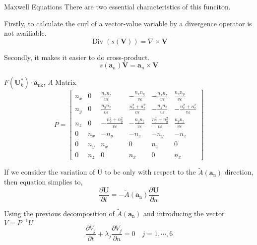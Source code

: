 \begin{frame}{Maxwell Equations}
There are two essential characteristics of this funciton.

Firstly, to calculate the curl of a vector-value variable by a divergence operator is not availiable. 
\begin{equation}
\operatorname{Div}(s(\boldsymbol{V}))=\nabla \times \boldsymbol{V}
\end{equation}


Secondly, it makes it easier to do cross-product.
\begin{equation}
s(\boldsymbol{a}_n)\boldsymbol{V}= \boldsymbol{a}_n \times \boldsymbol{V}
\end{equation}


\end{frame}
\begin{frame}{$F\left(\boldsymbol{U}_{k}^{*}\right) \cdot \boldsymbol{a}_{\mathrm{nk}}$, $A$ Matrix}
\begin{equation}
P=\left[\begin{array}{cccccc}{n_{x}} & {0} & {\frac{n_{x} n_{z}}{v \varepsilon}} & {-\frac{n_{x} n_{y}}{v \varepsilon}} & {-\frac{n_{x} n_{z}}{v \varepsilon}} & {\frac{n_{x} n_{y}}{v \varepsilon}} \\ {n_{y}} & {0} & {\frac{n_{y} n_{z}}{v \varepsilon}} & {\frac{n_{x}^{2}+n_{z}^{2}}{v \varepsilon}} & {-\frac{n_{y} n_{z}}{v \varepsilon}} & {-\frac{n_{x}^{2}+n_{z}^{2}}{v \varepsilon}} \\ {n_{z}} & {0} & {-\frac{n_{x}^{2}+n_{y}^{2}}{v \varepsilon}} & {-\frac{n_{y} n_{z}}{v \varepsilon}} & {\frac{n_{x}^{2}+n_{y}^{2}}{v \varepsilon}} & {\frac{n_{y} n_{z}}{v \varepsilon}} \\ {0} & {n_{x}} & {-n_{y}} & {-n_{z}} & {-n_{y}} & {-n_{z}} \\ {0} & {n_{y}} & {n_{x}} & {0} & {n_{x}} & {0} \\ {0} & {n_{z}} & {0} & {n_{x}} & {0} & {n_{x}}\end{array}\right]
\end{equation}

If we consider the variation of U to be only with respect to the $\tilde{A}\left(\boldsymbol{a}_{\mathrm{n}}\right)$ direction, then equation simplies to,
\begin{equation}
\frac{\partial \boldsymbol{U}}{\partial t}=-\tilde{A}\left(\boldsymbol{a}_{\mathrm{n}}\right) \frac{\partial \boldsymbol{U}}{\partial n}
\end{equation}

Using the previous decomposition of $\tilde{A}\left(\boldsymbol{a}_{\mathrm{n}}\right)$ and introducing the vector $V = P^{-1}U$
\begin{equation}
\frac{\partial V_{j}}{\partial t}+\lambda_{j} \frac{\partial V_{j}}{\partial n}=0 \quad j=1, \cdots, 6
\end{equation}

\end{frame}

